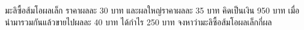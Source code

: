 ﻿%
\question มะลิซื้อส้มโอผลเล็ก ราคาผลละ 30 บาท และผลใหญ่ราคาผลละ 35 บาท คิดเป็นเงิน 950 บาท เมื่อนำมารวมกันแล้วขายไปผลละ 40 บาท ได้กำไร 250 บาท จงหาว่ามะลิซื้อส้มโอผลเล็กกี่ผล
\newline
{}
